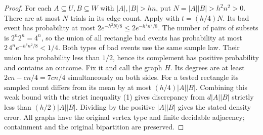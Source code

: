 \begin{proof}
For each $A\subseteq U,B\subseteq W$ with $|A|,|B|>hn$, put
$N=|A||B|>h^2n^2>0$. There are at most $N$ trials in its edge
count. Apply  with
$t=(h/4)N$. Its bad event has probability at most
$2e^{-h^2N/8}\leq2e^{-h^4n^2/8}$.
The number of pairs of subsets is $2^n2^n=4^n$, so the union
of all rectangle bad events has probability at most
$2\,4^n e^{-h^4n^2/8}<1/4$.
Both types of bad events use the same sample law. Their union
has probability less than $1/2$, hence its complement has positive
probability and contains an outcome. Fix it and call the graph $H$.
Its degrees are at least $2cn-cn/4=7cn/4$ simultaneously on both
sides. For a tested rectangle its sampled count differs from its
mean by at most $(h/4)|A||B|$. Combining this weak bound with
the strict inequality (1) gives discrepancy from $d|A||B|$
strictly less than $(h/2)|A||B|$. Dividing by the positive
$|A||B|$ gives the stated density error. All graphs have the
original vertex type and finite decidable adjacency; containment
and the original bipartition are preserved.
\end{proof}
